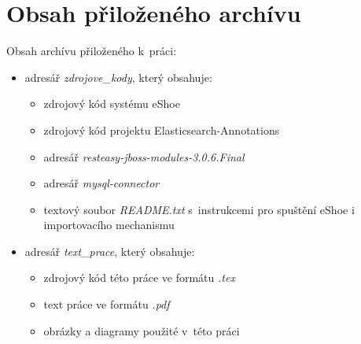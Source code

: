 \documentclass[11pt,oneside]{fithesis2}
\begin{document}
\chapter{Obsah přiloženého archívu}
Obsah archívu přiloženého k~práci:
\begin{itemize}
	\item adresář \emph{zdrojove\_kody}, který obsahuje:
		\begin{itemize}
		\item zdrojový kód systému eShoe
		\item zdrojový kód projektu Elasticsearch-Annotations
		\item adresář \emph{resteasy-jboss-modules-3.0.6.Final}
		\item adresář \emph{mysql-connector}
		\item textový soubor \emph{README.txt} s~instrukcemi pro spuštění eShoe i importovacího mechanismu
		\end{itemize}
	\item adresář \emph{text\_prace}, který obsahuje:
		\begin{itemize}
		\item zdrojový kód této práce ve formátu \emph{.tex}
		\item text práce ve formátu \emph{.pdf}
		\item obrázky a diagramy použité v~této práci
		\end{itemize}
\end{itemize}
\end{document}

